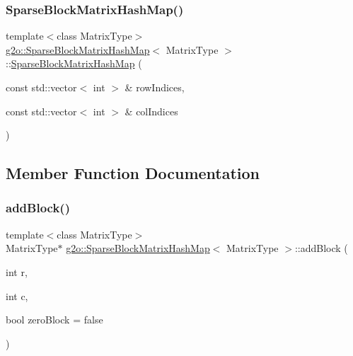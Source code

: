 \subsubsection{\texorpdfstring{Sparse\+Block\+Matrix\+Hash\+Map()}{SparseBlockMatrixHashMap()}}
{\footnotesize\ttfamily template$<$class Matrix\+Type$>$ \\
\mbox{\hyperlink{classg2o_1_1_sparse_block_matrix_hash_map}{g2o\+::\+Sparse\+Block\+Matrix\+Hash\+Map}}$<$ Matrix\+Type $>$\+::\mbox{\hyperlink{classg2o_1_1_sparse_block_matrix_hash_map}{Sparse\+Block\+Matrix\+Hash\+Map}} (\begin{DoxyParamCaption}\item[{const std\+::vector$<$ int $>$ \&}]{row\+Indices,  }\item[{const std\+::vector$<$ int $>$ \&}]{col\+Indices }\end{DoxyParamCaption})\hspace{0.3cm}{\ttfamily [inline]}}



\subsection{Member Function Documentation}
\mbox{\label{classg2o_1_1_sparse_block_matrix_hash_map_a08330c47b1b60bbe008e3c4ee2f5150f}} 
\subsubsection{\texorpdfstring{add\+Block()}{addBlock()}}
{\footnotesize\ttfamily template$<$class Matrix\+Type$>$ \\
Matrix\+Type$\ast$ \mbox{\hyperlink{classg2o_1_1_sparse_block_matrix_hash_map}{g2o\+::\+Sparse\+Block\+Matrix\+Hash\+Map}}$<$ Matrix\+Type $>$\+::add\+Block (\begin{DoxyParamCaption}\item[{int}]{r,  }\item[{int}]{c,  }\item[{bool}]{zero\+Block = {\ttfamily false} }\end{DoxyParamCaption})\hspace{0.3cm}{\ttfamily [inline]}}

